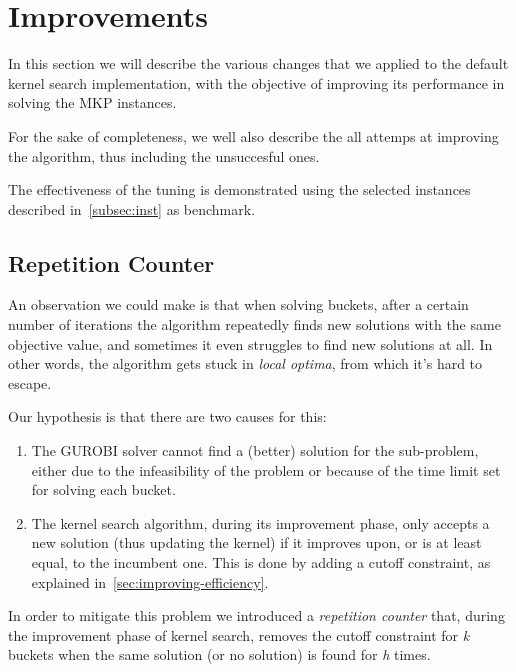 \chapter{Improvements}\label{ch:improvements}
In this section we will describe the various changes
that we applied to the default kernel search implementation,
with the objective of improving its performance
in solving the MKP instances.

For the sake of completeness, we well also describe the all attemps at improving
the algorithm, thus including the unsuccesful ones.

The effectiveness of the tuning is demonstrated using the selected instances
described in~\ref{subsec:inst} as benchmark.





\section{Repetition Counter}
An observation we could make is that when solving buckets,
after a certain number of iterations the algorithm
repeatedly finds new solutions with the same objective value,
and sometimes it even struggles to find new solutions at all.
In other words, the algorithm gets stuck in \textit{local optima},
from which it's hard to escape.

Our hypothesis is that there are two causes for this:
\begin{enumerate}
    \item The GUROBI solver cannot find a (better) solution for the sub-problem,
    either due to the infeasibility of the problem or because of
    the time limit set for solving each bucket.
    \item The kernel search algorithm, during its improvement phase,
    only accepts a new solution (thus updating the kernel)
    if it improves upon, or is at least equal, to the incumbent one.
    This is done by adding a cutoff constraint, as explained in~\ref{sec:improving-efficiency}.
\end{enumerate}

In order to mitigate this problem we introduced a \textit{repetition counter}
that, during the improvement phase of kernel search,
removes the cutoff constraint for \textit{k} buckets
when the same solution (or no solution) is found for \textit{h} times.

